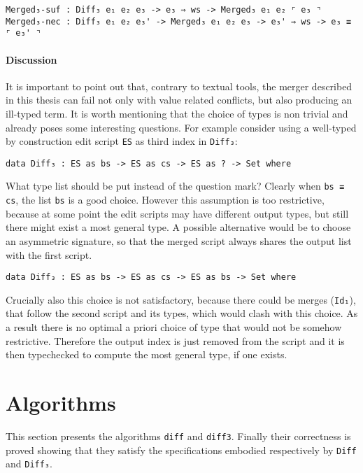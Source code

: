 \documentclass[../Thesis.tex]{subfiles}
\begin{document}
\begin{verbatim}
Merged₃-suf : Diff₃ e₁ e₂ e₃ -> e₃ ⇒ ws -> Merged₃ e₁ e₂ ⌜ e₃ ⌝
Merged₃-nec : Diff₃ e₁ e₂ e₃' -> Merged₃ e₁ e₂ e₃ -> e₃' ⇒ ws -> e₃ ≡ ⌜ e₃' ⌝
\end{verbatim}
	
	\paragraph{Discussion}
	It is important to point out that, contrary to textual tools, 
	the merger described in this thesis can fail 
	not only with value related conflicts, but also producing
	an ill-typed term.
	It is worth mentioning that the choice of types is non trivial and
	already poses some interesting questions.
	For example consider using a well-typed by construction edit script 
	\texttt{ES} as third index in \texttt{Diff₃}:

\begin{verbatim}
data Diff₃ : ES as bs -> ES as cs -> ES as ? -> Set where
\end{verbatim}	
	What type list should be put instead of the question mark?
	Clearly when \texttt{bs ≡ cs}, the list \texttt{bs} is a good choice.
	However this assumption is too restrictive, because at some
	point the edit scripts may have different output types, but still there might 
	exist a most general type.
	A possible alternative would be to choose an asymmetric signature,
	so that the merged script always shares the output list with the first script.
\begin{verbatim}
data Diff₃ : ES as bs -> ES as cs -> ES as bs -> Set where
\end{verbatim}	
	Crucially also this choice is not satisfactory, because 
	there could be merges (\texttt{Id₁}), that follow the second script and its 
	types, which would clash with this choice.
	As a result there is no optimal a priori choice of type that would not
	be somehow restrictive. Therefore the output index is just removed from
	the script and it is then typechecked to compute the most general type,
	if one exists.	  
		
\section{Algorithms}
This section presents the algorithms \texttt{diff} and \texttt{diff3}.
Finally their correctness is proved showing that they satisfy the specifications
embodied respectively by \texttt{Diff} and \texttt{Diff₃}.
\end{document}
